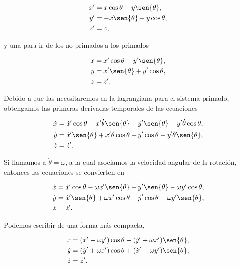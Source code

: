 \documentclass[a4paper,10pt]{article}
\numberwithin{equation}{section}
\begin{document}
\begin{align}
 x' &= x\cos{\theta} + y \sen{\theta}, \\
 y' &= -x\sen{\theta} + y\cos{\theta}, \\
 z' &= z,
\end{align}

y una para ir de los no primados a los primados

\begin{align}
 x &= x'\cos{\theta} - y' \sen{\theta}, \\
 y &= x'\sen{\theta} + y'\cos{\theta}, \\
 z &= z',
 \label{eq:transfCoordNonInertial}
\end{align}

Debido a que las necesitaremos en la lagrangiana para el sistema primado, obtengamos 
las primeras derivadas temporales de las ecuaciones 

\begin{align}
 \dot{x} &= \dot{x}'\cos{\theta} - x'\dot{\theta}\sen{\theta} - \dot{y}'\sen{\theta} - y'\dot{\theta}\cos{\theta}, \\
 \dot{y} &= \dot{x}'\sen{\theta} + x'\dot{\theta}\cos{\theta} + \dot{y}'\cos{\theta} - y'\dot{\theta}\sen{\theta}, \\
 \dot{z} &= \dot{z}'.
 \label{eq:derivTransfNonInertial1}
\end{align}

Si llamamos a $\dot{\theta} = \omega$, a la cual asociamos la velocidad angular de 
la rotación, entonces las ecuaciones  se convierten en

\begin{align}
  \dot{x} &= \dot{x}'\cos{\theta} - \omega x'\sen{\theta} - \dot{y}'\sen{\theta} - \omega y'\cos{\theta}, \\
 \dot{y} &= \dot{x}'\sen{\theta} + \omega x'\cos{\theta} + \dot{y}'\cos{\theta} - \omega y'\sen{\theta}, \\
 \dot{z} &= \dot{z}'.
 \label{eq:derivTransfNonInertial2}
\end{align}

Podemos escribir  de una forma más compacta,

\begin{align}
 \dot{x} &= (\dot{x}' - \omega y')\cos{\theta} - (\dot{y}' + \omega x')\sen{\theta}, \\
 \dot{y} &= (\dot{y}' + \omega x')\cos{\theta} + (\dot{x}' - \omega y')\sen{\theta}, \\
 \dot{z} &= \dot{z}'.
\end{align}
\end{document}
